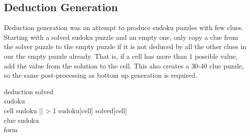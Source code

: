 \subsection{Deduction Generation}
Deduction generation was an attempt to produce sudoku puzzles with few clues. Starting with a solved sudoku puzzle and an empty one,
only copy a clue from the solver puzzle to the empty puzzle if it is not deduced by all the other clues in our the empty puzzle already.
That is, if a cell has more than $1$ possible value, add the value from the solution to the cell. This also creates a $30$-$40$ clue puzzle,
so the same post-processing as bottom up generation is required.
\begin{center}
\begin{pseudocode}[framebox]{deduction}{ }
    solved \GETS {}      \\
    sudoku \GETS {}      \\
    \FOR cell \in sudoku \DO
        \IF || > 1 \THEN
            sudoku[cell] \GETS solved[cell]         \\
    \FOR clue \in sudoku \DO \BEGIN
                  \\
        \IF form \neq {} \THEN
    \END                                            \\
    \label{algo:deduction}
\end{pseudocode}
\end{center}

